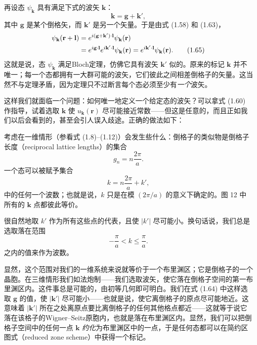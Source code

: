 再设态 $\psi_{\mathbf{k}}$ 具有满足下式的波矢 $\mathbf{k}$：
\begin{equation*}
\mathbf{k}=\mathbf{g}+\mathbf{k}',
\tag{1.64}
\end{equation*}
其中 $\mathbf{g}$ 是某个倒格矢，而 $\mathbf{k}'$ 是另一个矢量。于是由式 (1.58) 和 (1.63)，
\begin{align*}
\psi_{\mathbf{k}}(\mathbf{r}+\mathbf{l})&=e^{i(\mathbf{g}+\mathbf{k}')\cdot\mathbf{l}}\psi_{\mathbf{k}}(\mathbf{r})\notag\\
&=e^{i\mathbf{g}\cdot\mathbf{l}}e^{i\mathbf{k}'\cdot\mathbf{l}}\psi_{\mathbf{k}}(\mathbf{r})=e^{i\mathbf{k}'\cdot\mathbf{l}}\psi_{\mathbf{k}}(\mathbf{r}).
\tag{1.65}
\end{align*}
这就是说，态 $\psi_{\mathbf{k}}$ 满足Bloch定理，仿佛它具有波矢 $\mathbf{k}'$ 似的。原来的标记 $\mathbf{k}$ 并不唯一；每一个态都拥有一大群可能的波矢，它们彼此之间相差倒格子的矢量。这当然不与定理矛盾，因为定理只不过断言每个态必须至少有\emph{一个}波矢。

这样我们就面临一个问题：如何唯一地定义一个给定态的波矢？可以拿式 (1.60) 作指导，试着选取 $\mathbf{k}$ 使 $u_{\mathbf{k}}(\mathbf{r})$ 尽可能接近常数——但这是任意的，而且正如我们以后会看到的，甚至会引人误入歧途。正确的做法如下：

考虑在一维情形（参看式 (1.8)–(1.12)）会发生些什么：倒格子的类似物是倒格子长度（reciprocal lattice lengths）的集合
\begin{equation*}
g_n=n\frac{2\pi}{a}.
\tag{1.66}
\end{equation*}
一个态可以被赋予集合
\begin{equation*}
k=n\frac{2\pi}{a}+k',
\tag{1.67}
\end{equation*}
中的任何一个波数；也就是说，$k$ 只是在模 $(2\pi/a)$ 的意义下确定的。图 12 中所有的 $\mathbf{k}$ 点都彼此等价。


很自然地取 $k'$ 作为所有这些点的代表，且使 $|k'|$ 尽可能小。换句话说，我们总是选取落在范围
\begin{equation*}
-\frac{\pi}{a}<k\leqslant\frac{\pi}{a}.
\tag{1.68}
\end{equation*}
之内的值来作为波数。

显然，这个范围对我们的一维系统来说就等价于一个布里渊区；它是倒格子的一个晶胞。在三维情形我们如法炮制——我们选取波矢，使它落在倒格子空间的第一布里渊区内。这件事总是可能的，由初等几何即可明白。我们在式 (1.64) 中这样选取 $\mathbf{g}$ 的值，使 $|\mathbf{k}'|$ 尽可能小——也就是说，使它离倒格子的原点尽可能地近。这意味着 $|\mathbf{k}'|$ 所在之处离原点要比离倒格子的任何其他格点都近——这就等于说它落在该格子的Wigner–Seitz原胞内，也就是落在布里渊区内。显然，我们可以把倒格子空间中的任何一点 $\mathbf{k}$ \emph{约化}为布里渊区中的一点，于是任何态都可以在简约区图式（reduced zone scheme）中获得一个标记。

